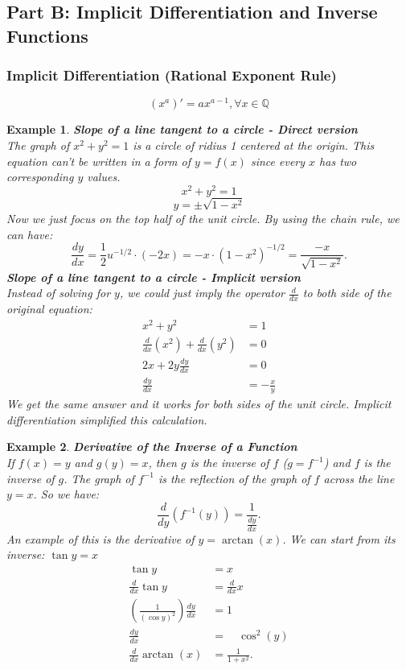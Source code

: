 \documentclass[10pt, a4paper]{article}
\newtheorem{example}{Example}
\begin{document}
\subsection*{Part B: Implicit Differentiation and Inverse Functions}
\subsubsection*{Implicit Differentiation (Rational Exponent Rule)}
\[
    (x^a)' = ax^{a-1}, \forall x \in \mathbb{Q} 
\]

\begin{example}
    \textbf{Slope of a line tangent to a circle - Direct version} \\
    The graph of $x^2 + y^2 = 1$ is a circle of ridius 1 centered at the origin. 
    This equation can't be written in a form of $y = f(x)$ since every $x$ has two corresponding $y$ values.
    \[
        x^2 + y^2 = 1
    \]
    \[
        y = \pm \sqrt{1 - x^2}
    \]
    Now we just focus on the top half of the unit circle. By using the chain rule, we can have: 
    \[
        \frac{dy}{dx}=\frac12u^{-1/2}\cdot(-2x)=-x\cdot(1-x^2)^{-1/2}=\frac{-x}{\sqrt{1-x^2}}.
    \]
    \textbf{Slope of a line tangent to a circle - Implicit version} \\
    Instead of solving for $y$, we could just imply the operator $\frac{d}{dx}$ to both side of the original equation:
    \begin{align*}
        x^2 + y^2 &= 1 \\
        \frac{d}{dx} (x^2) + \frac{d}{dx} (y^2) &= 0 \\
        2x + 2y\frac{dy}{dx} &= 0 \\
        \frac{dy}{dx} &= -\frac{x}{y}
    \end{align*}
    We get the same answer and it works for both sides of the unit circle.
    Implicit differentiation simplified this calculation.
\end{example}
\begin{example}
    \textbf{Derivative of the Inverse of a Function}\\
    If $f(x) = y$ and $g(y) = x$, then $g$ is the inverse of $f$ ($g = f^{-1}$) and $f$ is the inverse of $g$.
    The graph of $f ^{−1}$ is the reflection of the graph of $f$ across the line $y = x$. So we have:
    \[
        \frac d{dy}(f^{-1}(y))=\frac1{\frac{dy}{dx}}.
    \]
    An example of this is the derivative of $y = \arctan(x)$. We can start from its inverse: $\tan y = x$
    \begin{align*}
        \tan y &= x \\
        \frac{d}{dx}\tan y &= \frac{d}{dx}x \\
        \left(\frac{1}{(\cos y)^2}\right)\frac{dy}{dx} &= 1 \\
        \frac{dy}{dx}\quad &= \quad\cos^2(y)\\
        \frac d{dx}\arctan(x)&=\frac1{1+x^2}. 
    \end{align*} 
\end{example}
\end{document}
